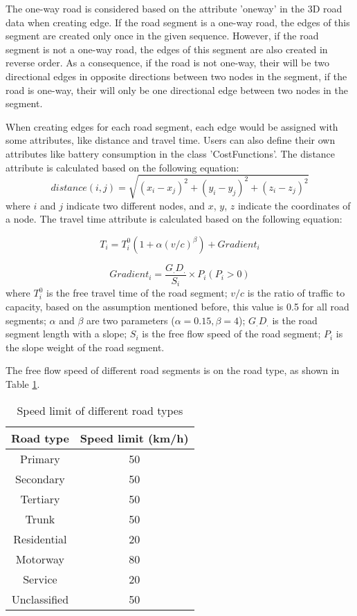 \documentclass[final-report]{report-template}
\begin{document}
The one-way road is considered based on the attribute 'oneway' in the 3D road data when creating edge.
If the road segment is a one-way road, the edges of this segment are created only once in the given sequence. 
However, if the road segment is not a one-way road, the edges of this segment are also created in reverse order.
As a consequence, if the road is not one-way, their will be two directional edges in opposite directions between two nodes in the segment,
if the road is one-way, their will only be one directional edge between two nodes in the segment.

When creating edges for each road segment, each edge would be assigned with some attributes, like distance and travel time.
Users can also define their own attributes like battery consumption in the class 'CostFunctions'. 
The distance attribute is calculated based on the following equation:
\begin{equation}
    distance(i,j) = \sqrt{(x_i-x_j)^2 + (y_i-y_j)^2 + (z_i-z_j)^2}
\end{equation}
where $i$ and $j$ indicate two different nodes, and $x$, $y$, $z$ indicate the coordinates of a node.
The travel time attribute is calculated based on the following equation:

\begin{equation}
    T_i = T_i^0(1+\alpha(v/c)^\beta)+Gradient_i
\end{equation}

\begin{equation}
    Gradient_i = \frac{G_.D_.}{S_i} \times P_i(P_i>0)
\end{equation}
where $T_i^0$ is the free travel time of the road segment; 
$v/c$ is the ratio of traffic to capacity, based on the assumption mentioned before, this value is 0.5 for all road segments;
$\alpha$ and $\beta$ are two parameters ($\alpha=0.15, \beta=4$); $G_.D_.$ is the road segment length with a slope;
$S_i$ is the free flow speed of the road segment; $P_i$ is the slope weight of the road segment. 

The free flow speed of different road segments is on the road type, as shown in Table \ref{tab:speed_limit}.
\begin{table}[H]
    \centering
    \begin{tabular}{|c|c|}
    \hline
    Road type & Speed limit (km/h) \\
    \hline
    Primary & 50 \\
    Secondary & 50 \\
    Tertiary & 50 \\
    Trunk & 50 \\
    Residential & 20 \\
    Motorway & 80 \\
    Service & 20 \\
    Unclassified & 50 \\
    \hline
    \end{tabular}
    \caption{\label{tab:speed_limit}Speed limit of different road types}
\end{table}
    
\end{document}
